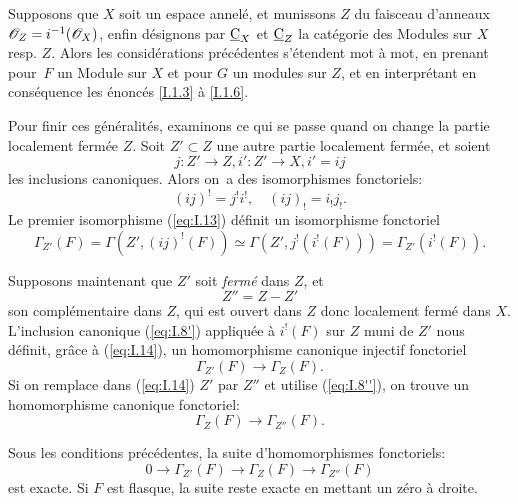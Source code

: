 \begin{remarque} \label{I.1.7}
Supposons que $X$ soit un espace annel\'e, et munissons $Z$ du faisceau d'anneaux ${\mathscr O}_Z=i^{-1}(\mathscr{O}_X)$, enfin d\'esignons par $\underline{\mathrm{C}}_X$ et $\underline{\mathrm{C}}_Z$ la cat\'egorie des Modules sur $X$ resp. $Z$. Alors les consid\'erations pr\'ec\'edentes s'\'etendent mot \`a mot, en prenant pour~$F$ un Module sur $X$ et pour $G$ un modules sur $Z$, et en interpr\'etant en cons\'equence les \'enonc\'es \ref{I.1.3} \`a \ref{I.1.6}.
\end{remarque}

Pour finir ces g\'en\'eralit\'es, examinons ce qui se passe quand on change la partie localement ferm\'ee $Z$. Soit $Z'\subset Z$ une autre partie localement ferm\'ee, et soient
$$j: Z' \to Z, i': Z' \to X, i'=ij$$
les inclusions canoniques. Alors on~a des isomorphismes fonctoriels:
\begin{equation} \label{eq:I.13} {(ij)^!=j^!i^!, \quad (ij)_!=i_!j_!}.
\end{equation}
Le premier isomorphisme (\ref{eq:I.13}) d\'efinit un isomorphisme fonctoriel
\begin{equation} \label{eq:I.14} {\Gamma_{Z'}(F)=\Gamma(Z', (ij)^!(F))\simeq \Gamma(Z', j^!(i^!(F)))=\Gamma_{Z'}(i^!(F))}.
\end{equation}

Supposons maintenant que $Z'$ soit \textit{fermé} dans $Z$, et
$$Z''=Z-Z'$$
son compl\'ementaire dans $Z$, qui est ouvert dans $Z$ donc localement ferm\'e dans $X$. L'inclusion canonique (\ref{eq:I.8'}) appliqu\'ee \`a $i^!(F)$ sur $Z$ muni de $Z'$ nous d\'efinit, gr\^ace \`a (\ref{eq:I.14}), un homomorphisme canonique injectif fonctoriel
\begin{equation} \label{eq:I.15} {\Gamma_{Z'}(F) \to \Gamma_Z(F)}.
\end{equation}
Si on remplace dans (\ref{eq:I.14}) $Z'$ par $Z''$ et utilise (\ref{eq:I.8''}), on trouve un homomorphisme canonique fonctoriel:
\begin{equation*} \label{eq:I.15'} \tag{$15'$} {\Gamma_Z(F) \to \Gamma_{Z''}(F)}.
\end{equation*}

\begin{proposition} \label{I.1.8} Sous les conditions pr\'ec\'edentes, la suite d'homomorphismes fonctoriels:
\begin{equation} \label{eq:I.16} {0 \to \Gamma_{Z'}(F) \to \Gamma_Z(F) \to \Gamma_{Z''}(F)}
\end{equation}
est exacte. Si $F$ est flasque, la suite reste exacte en mettant un z\'ero \`a droite.
\end{proposition}

